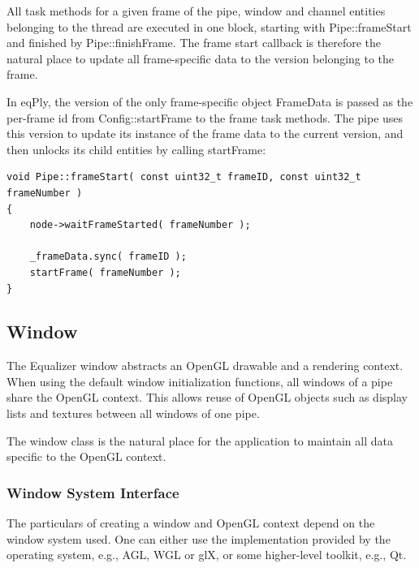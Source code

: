 \documentclass[10pt,a4]{scrartcl}
\begin{document}
All task methods for a given frame of the pipe, window and channel
entities belonging to the thread are executed in one block, starting
with \textsf{Pipe::frameStart} and finished by
\textsf{Pipe::finishFrame}. The frame start callback is therefore the
natural place to update all frame-specific data to the version belonging
to the frame. 

In \textsf{eqPly}, the version of the only frame-specific object
\textsf{FrameData} is passed as the per-frame id from
\textsf{Config::startFrame} to the frame task methods. The pipe uses
this version to update its instance of the frame data to the current
version, and then unlocks its child entities by calling
\textsf{startFrame}:

{\footnotesize\begin{lstlisting}
void Pipe::frameStart( const uint32_t frameID, const uint32_t frameNumber )
{
    node->waitFrameStarted( frameNumber );

    _frameData.sync( frameID );
    startFrame( frameNumber );
}
\end{lstlisting}}


\subsection{\label{sEqplyWIndow}Window}

The Equalizer window abstracts an OpenGL drawable and a rendering
context. When using the default window initialization functions, all
windows of a pipe share the OpenGL context. This allows reuse of OpenGL
objects such as display lists and textures between all windows of one
pipe.

The window class is the natural place for the application to maintain
all data specific to the OpenGL context.

\subsubsection{Window System Interface}

The particulars of creating a window and OpenGL context depend on the
window system used. One can either use the implementation provided by
the operating system, e.g., AGL, WGL or glX, or some higher-level
toolkit, e.g., Qt.
\end{document}
